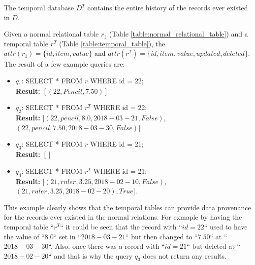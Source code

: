 		The temporal database $D^T$ contains the entire history of the records ever existed in $D$.

		\begin{example}
			Given a normal relational table $r_1$ (Table \ref{table:normal_relational_table}) and a temporal table $r^T$ (Table \ref{table:temporal_table}), the $attr(r_1) = \{id, item, value\}$ and $attr(r^T)= \{id, item, value, updated, deleted\}$. The result of a few example queries are:

			\begin{itemize}
				\item {$q_1$: SELECT * FROM $r$ WHERE id = 22;}\\
				\textbf{Result:} $[(22,Pencil,7.50)]$
				\item {$q_2$: SELECT * FROM $r^T$ WHERE id = 22;}\\
				\textbf{Result:} $[(22,pencil,8.0,2018-03-21,False)$, \\$(22,pencil,7.50,2018-03-30,False)]$
				\item {$q_3$: SELECT * FROM $r$ WHERE id = 21;}\\
				\textbf{Result:} $[]$
				\item {$q_4$: SELECT * FROM $r^T$ WHERE id = 21;}\\
				\textbf{Result:} $[(21,ruler,3.25,2018-02-10,False)$, \\$(21,ruler,3.25,2018-02-20), True]$.
			\end{itemize}
			This example clearly shows that the temporal tables can provide data provenance for the records ever existed in the normal relations. For exmaple by having the temporal table ``$r^T$`` it could be seen that the record with ``$id = 22$`` used to have the value of ``$8.0$`` set in ``$2018-03-21$`` but then changed to ``$7.50$`` at ``$2018-03-30$``. Also, once there was a record with ``$id = 21$`` but deleted at ``$2018-02-20$`` and that is why the query $q_3$ does not return any results.
		\label{example:temporal_table}
		\end{example}

